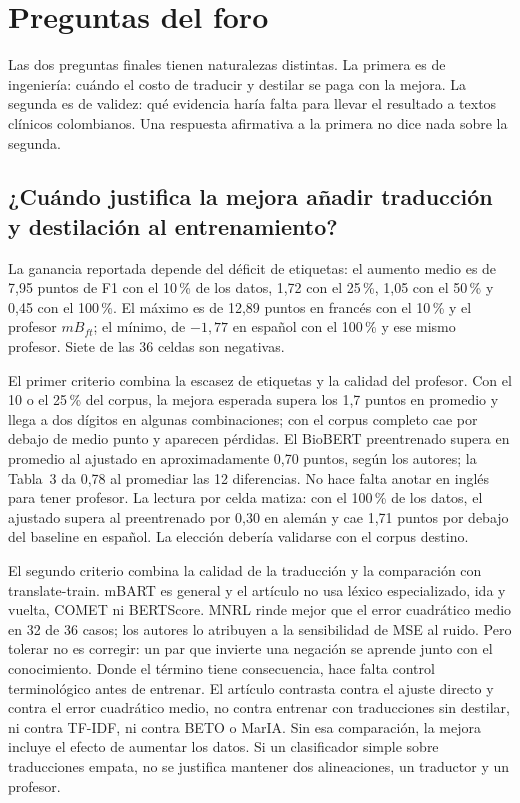\section{Preguntas del foro}
\label{sec:foro}

Las dos preguntas finales tienen naturalezas distintas. La primera es de ingeniería: cuándo el costo de traducir y destilar se paga con la mejora. La segunda es de validez: qué evidencia haría falta para llevar el resultado a textos clínicos colombianos. Una respuesta afirmativa a la primera no dice nada sobre la segunda.

\subsection{¿Cuándo justifica la mejora añadir traducción y destilación al entrenamiento?}

La ganancia reportada \cite{piperno2025} depende del déficit de etiquetas: el aumento medio es de 7,95 puntos de F1 con el 10\,\% de los datos, 1,72 con el 25\,\%, 1,05 con el 50\,\% y 0,45 con el 100\,\%. El máximo es de 12,89 puntos en francés con el 10\,\% y el profesor $mB_{ft}$; el mínimo, de $-1{,}77$ en español con el 100\,\% y ese mismo profesor. Siete de las 36 celdas son negativas.

El primer criterio combina la escasez de etiquetas y la calidad del profesor. Con el 10 o el 25\,\% del corpus, la mejora esperada supera los 1,7 puntos en promedio y llega a dos dígitos en algunas combinaciones; con el corpus completo cae por debajo de medio punto y aparecen pérdidas. El BioBERT preentrenado supera en promedio al ajustado en aproximadamente 0,70 puntos, según los autores; la Tabla~3 da 0,78 al promediar las 12 diferencias. No hace falta anotar en inglés para tener profesor. La lectura por celda matiza: con el 100\,\% de los datos, el ajustado supera al preentrenado por 0,30 en alemán y cae 1,71 puntos por debajo del baseline en español. La elección debería validarse con el corpus destino.

El segundo criterio combina la calidad de la traducción y la comparación con translate-train. mBART es general y el artículo no usa léxico especializado, ida y vuelta, COMET ni BERTScore. MNRL rinde mejor que el error cuadrático medio en 32 de 36 casos; los autores lo atribuyen a la sensibilidad de MSE al ruido. Pero tolerar no es corregir: un par que invierte una negación se aprende junto con el conocimiento. Donde el término tiene consecuencia, hace falta control terminológico antes de entrenar. El artículo contrasta contra el ajuste directo y contra el error cuadrático medio, no contra entrenar con traducciones sin destilar, ni contra TF-IDF, ni contra BETO o MarIA. Sin esa comparación, la mejora incluye el efecto de aumentar los datos. Si un clasificador simple sobre traducciones empata, no se justifica mantener dos alineaciones, un traductor y un profesor.

